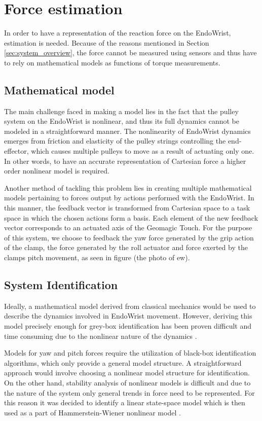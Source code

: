 \section{Force estimation}\label{sec:force_estimation}
In order to have a representation of the reaction force on the EndoWrist, estimation is needed.
Because of the reasons mentioned in Section \ref{sec:system_overview}, the force cannot be measured using sensors and thus have to rely on mathematical models as functions of torque measurements.

\subsection{Mathematical model}
The main challenge faced in making a model lies in the fact that the pulley system on the EndoWrist is nonlinear, and thus its full dynamics cannot be modeled in a straightforward manner. 
The nonlinearity of EndoWrist dynamics emerges from friction and elasticity of the pulley strings controlling the end-effector, which causes multiple pulleys to move as a result of actuating only one. 
In other words, to have an accurate representation of Cartesian force a higher order nonlinear model is required.

Another method of tackling this problem lies in creating multiple mathematical models pertaining to forces output by actions performed with the EndoWrist.
In this manner, the feedback vector is transformed from Cartesian space to a task space in which the chosen actions form a basis.
Each element of the new feedback vector corresponds to an actuated axis of the Geomagic Touch.
For the purpose of this system, we choose to feedback the yaw force generated by the grip action of the clamp, the force generated by the roll actuator and force exerted by the clamps pitch movement, as seen in figure (the photo of ew).

\subsection{System Identification}
Ideally, a mathematical model derived from classical mechanics would be used to describe the dynamics involved in EndoWrist movement.
However, deriving this model precisely enough for grey-box identification has been proven difficult and time consuming due to the nonlinear nature of the dynamics \cite{kim2014dynamic}.

Models for yaw and pitch forces require the utilization of black-box identification algorithms, which only provide a general model structure. 
A straightforward approach would involve choosing a nonlinear model structure for identification.
On the other hand, stability analysis of nonlinear models is difficult and due to the nature of the system only general trends in force need to be represented.
For this reason it was decided to identify a linear state-space model which is then used as a part of Hammerstein-Wiener nonlinear model \cite{zhu2002estimation}.

